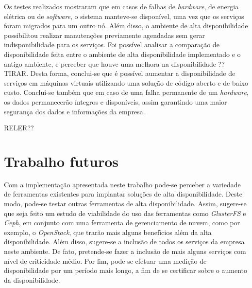 Os testes realizados mostraram que em casos de falhas de \textit{hardware}, de energia elétrica ou de \textit{software}, o sistema manteve-se
disponível, uma vez que os serviços foram migrados para um outro nó. Além disso, o ambiente de alta disponibilidade possibilitou
realizar manutenções previamente agendadas sem gerar indisponibilidade para os serviços.
Foi possível analisar a comparação de disponibilidade feita entre o ambiente de alta disponibilidade implementado e o antigo ambiente,
e perceber que houve uma melhora na disponibilidade ?? TIRAR. 
Desta forma, conclui-se que é possível aumentar a disponibilidade de serviços em máquinas virtuais utilizando uma solução 
de código aberto e de baixo custo.
Conclui-se também que em caso de uma falha permanente de um \textit{hardware}, os dados permanecerão íntegros e disponíveis, assim garantindo 
uma maior segurança dos dados e informações da empresa.

RELER??

\section{Trabalho futuros}
\label{section:trabalhosfuturos}

Com a implementação apresentada neste trabalho pode-se perceber a variedade de ferramentas existentes para implantar soluções de alta 
disponibilidade. Deste modo, pode-se testar outras ferramentas de alta disponibilidade. Assim, sugere-se que seja feito um estudo de
viabilidade do uso das ferramentas como \textit{GlusterFS} e \textit{Ceph}, em conjunto com uma ferramenta de gerenciamento de nuvem, como
por exemplo, o \textit{OpenStack}, que trarão mais alguns benefícios além da alta disponibilidade.
Além disso, sugere-se a inclusão de todos os serviços da empresa neste ambiente. De fato, pretende-se fazer a inclusão de mais alguns
serviços com nível de criticidade médio.
Por fim, pode-se efetuar uma medição de disponibilidade por um período mais longo, a fim de se certificar sobre o aumento da
disponibilidade.

